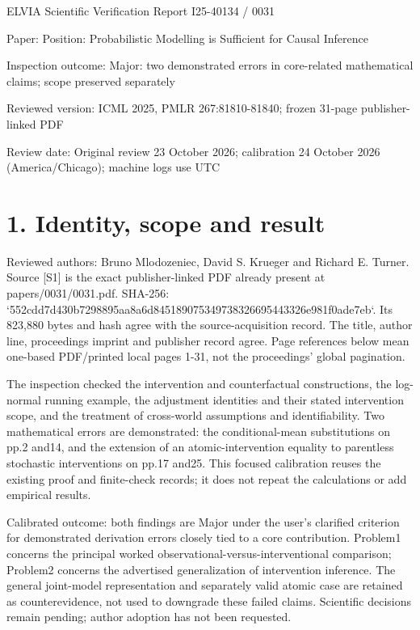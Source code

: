 \documentclass[10pt]{article}
\begin{document}
ELVIA Scientific Verification Report
I25-40134 / 0031\par
Paper: Position: Probabilistic Modelling is Sufficient for Causal Inference\par
Inspection outcome: Major: two demonstrated errors in core-related mathematical claims; scope preserved separately\par
Reviewed version: ICML 2025, PMLR 267:81810-81840; frozen 31-page publisher-linked PDF\par
Review date: Original review 23 October 2026; calibration 24 October 2026 (America/Chicago); machine logs use UTC\par
\section*{1. Identity, scope and result}
Reviewed authors: Bruno Mlodozeniec, David S. Krueger and Richard E. Turner. Source [S1] is the exact publisher-linked PDF already present at papers/0031/0031.pdf. SHA-256: `552cdd7d430b7298895aa8a6d845189075349738326695443326e981f0ade7eb`. Its 823,880 bytes and hash agree with the source-acquisition record. The title, author line, proceedings imprint and publisher record agree. Page references below mean one-based PDF/printed local pages 1-31, not the proceedings’ global pagination.\par
The inspection checked the intervention and counterfactual constructions, the log-normal running example, the adjustment identities and their stated intervention scope, and the treatment of cross-world assumptions and identifiability. Two mathematical errors are demonstrated: the conditional-mean substitutions on pp.2 and14, and the extension of an atomic-intervention equality to parentless stochastic interventions on pp.17 and25. This focused calibration reuses the existing proof and finite-check records; it does not repeat the calculations or add empirical results.\par
Calibrated outcome: both findings are Major under the user’s clarified criterion for demonstrated derivation errors closely tied to a core contribution. Problem1 concerns the principal worked observational-versus-interventional comparison; Problem2 concerns the advertised generalization of intervention inference. The general joint-model representation and separately valid atomic case are retained as counterevidence, not used to downgrade these failed claims. Scientific decisions remain pending; author adoption has not been requested.\par
\end{document}
